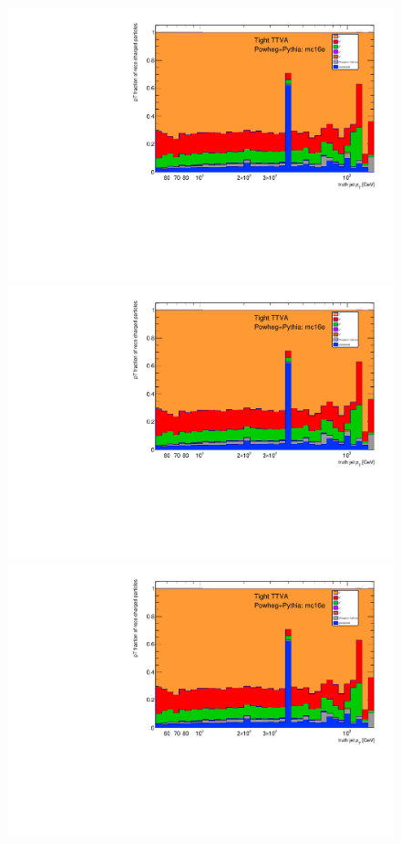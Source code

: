 \begin{figure}[tbh]
\centering
\includegraphics[scale=0.3, page=6]{figures/jet_comp_study_powheg_Tight_pTFraction_mc16e.pdf}
\includegraphics[scale=0.3, page=7]{figures/jet_comp_study_powheg_Tight_pTFraction_mc16e.pdf}
\includegraphics[scale=0.3, page=8]{figures/jet_comp_study_powheg_Tight_pTFraction_mc16e.pdf}

\end{figure}
